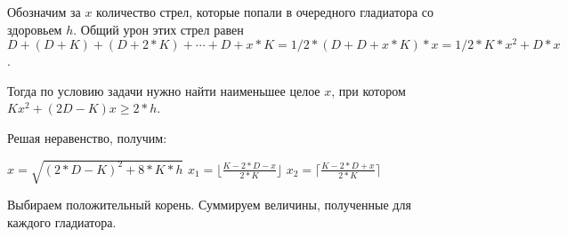 \solutionSection

Обозначим за $x$ количество стрел, которые попали в очередного гладиатора со здоровьем $h$. Общий урон этих стрел равен $D + (D + K) + (D + 2*K) + \cdots + D + x * K = 1/2 * (D + D + x * K) * x = 1/2 * K*x^2 + D*x$.

Тогда по условию задачи нужно найти наименьшее целое $x$, при котором $Kx^2 + (2D - K)x \ge 2 * h$.

Решая неравенство, получим:

$x = \sqrt{(2*D - K)^2 + 8*K*h}$
$x_1 = \lfloor\frac{K - 2*D - x}{2*K}\rfloor$
$x_2 = \lceil\frac{K - 2*D + x}{2*K}\rceil$

Выбираем положительный корень. Суммируем величины, полученные для каждого гладиатора.

\codeExample

